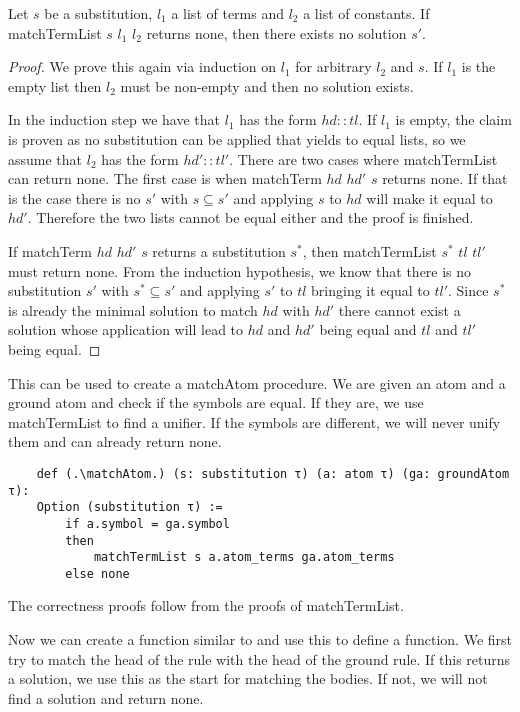 \begin{lemma}[\matchTermListNoneImplNoSolution]
    Let $s$ be a substitution, $l_1$ a list of terms and $l_2$ a list of constants. If matchTermList $s$ $l_1$ $l_2$ returns none, then there exists no solution $s'$.
\end{lemma}
\begin{proof}
    We prove this again via induction on $l_1$ for arbitrary $l_2$ and $s$. If $l_1$ is the empty list then $l_2$ must be non-empty and then no solution exists.

    In the induction step we have that $l_1$ has the form $hd::tl$. If $l_1$ is empty, the claim is proven as no substitution can be applied that yields to equal lists, so we assume that $l_2$ has the form $hd'::tl'$. There are two cases where matchTermList can return none. The first case is when matchTerm $hd$ $hd'$ $s$ returns none. If that is the case there is no $s'$ with $s\subseteq s'$ and applying $s$ to $hd$ will make it equal to $hd'$. Therefore the two lists cannot be equal either and the proof is finished.

    If matchTerm $hd$ $hd'$ $s$ returns a substitution $s^\ast$, then matchTermList $s^\ast$ $tl$ $tl'$ must return none. From the induction hypothesis, we know that there is no substitution $s'$ with $s^\ast \subseteq s'$ and applying $s'$ to $tl$ bringing it equal to $tl'$. Since $s^\ast$ is already the minimal solution to match $hd$ with $hd'$ there cannot exist a solution whose application will lead to $hd$ and $hd'$ being equal and $tl$ and $tl'$ being equal.
\end{proof}

This can be used to create a matchAtom procedure. We are given an atom and a ground atom and check if the symbols are equal. If they are, we use matchTermList to find a unifier.
If the symbols are different, we will never unify them and can already return none.

\begin{lstlisting}
    def (.\matchAtom.) (s: substitution τ) (a: atom τ) (ga: groundAtom τ):
    Option (substitution τ) :=
        if a.symbol = ga.symbol
        then
            matchTermList s a.atom_terms ga.atom_terms
        else none
\end{lstlisting}

The correctness proofs follow from the proofs of matchTermList.

Now we can create a \matchAtomList function similar to \matchTermList and use this to define a \matchRule function. We first try to match the head of the rule with the head of the ground rule. If this returns a solution, we use this as the start for matching the bodies. If not, we will not find a solution and return none.


